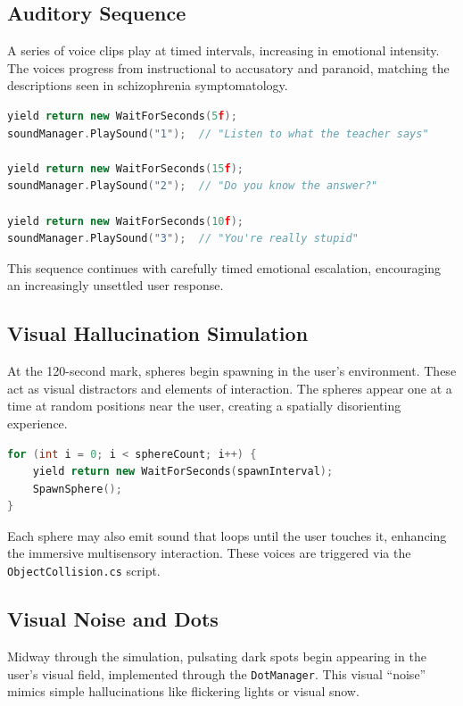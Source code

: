 \subsection{Auditory Sequence}

A series of voice clips play at timed intervals, increasing in emotional intensity. The voices progress from instructional to accusatory and paranoid, matching the descriptions seen in schizophrenia symptomatology.

\begin{lstlisting}[language=C++]
yield return new WaitForSeconds(5f);
soundManager.PlaySound("1");  // "Listen to what the teacher says"

yield return new WaitForSeconds(15f);
soundManager.PlaySound("2");  // "Do you know the answer?"

yield return new WaitForSeconds(10f);
soundManager.PlaySound("3");  // "You're really stupid"
\end{lstlisting}

This sequence continues with carefully timed emotional escalation, encouraging an increasingly unsettled user response.

\subsection{Visual Hallucination Simulation}

At the 120-second mark, spheres begin spawning in the user's environment. These act as visual distractors and elements of interaction. The spheres appear one at a time at random positions near the user, creating a spatially disorienting experience.

\begin{lstlisting}[language=C++]
for (int i = 0; i < sphereCount; i++) {
    yield return new WaitForSeconds(spawnInterval);
    SpawnSphere();
}
\end{lstlisting}

Each sphere may also emit sound that loops until the user touches it, enhancing the immersive multisensory interaction. These voices are triggered via the \texttt{ObjectCollision.cs} script.

\subsection{Visual Noise and Dots}

Midway through the simulation, pulsating dark spots begin appearing in the user's visual field, implemented through the \texttt{DotManager}. This visual “noise” mimics simple hallucinations like flickering lights or visual snow.

